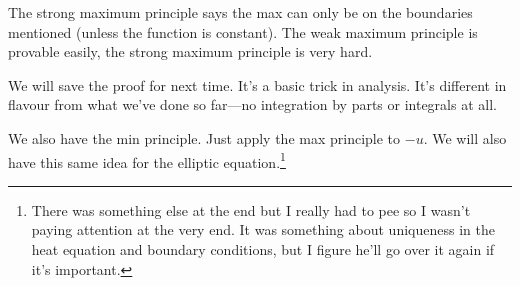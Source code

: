 \begin{remark}
	The strong maximum principle says the max can only be on the boundaries mentioned (unless the function is constant). The weak maximum principle is provable easily, the strong maximum principle is very hard.
\end{remark}
We will save the proof for next time. It's a basic trick in analysis. It's different in flavour from what we've done so far---no integration by parts or integrals at all.

We also have the min principle. Just apply the max principle to \( -u \). We will also have this same idea for the elliptic equation.\footnote{There was something else at the end but I really had to pee so I wasn't paying attention at the very end. It was something about uniqueness in the heat equation and boundary conditions, but I figure he'll go over it again if it's important.}
